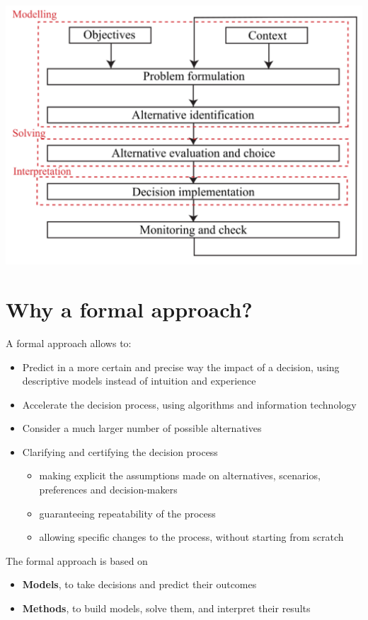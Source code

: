 \begin{center}
	\includegraphics[width=0.75\columnwidth]{img/dp/intro/decisionIter}
\end{center}

\section{Why a formal approach?}
\label{sec:whyformal}

A formal approach allows to: 
\begin{itemize}
	\item Predict in a more certain and precise way the impact of a decision, using descriptive models instead of intuition and experience
	
	\item Accelerate the decision process, using algorithms and information technology
	
	\item Consider a much larger number of possible alternatives
	
	\item Clarifying and certifying the decision process
	\begin{itemize}
		\item making explicit the assumptions made on alternatives, scenarios, preferences and decision-makers
		
		\item guaranteeing repeatability of the process 
		
		\item allowing specific changes to the process, without starting from scratch
	\end{itemize}
\end{itemize}

The formal approach is based on
\begin{itemize}
	\item \textbf{Models}, to take decisions and predict their outcomes
	
	\item \textbf{Methods}, to build models, solve them, and interpret their results
\end{itemize}

